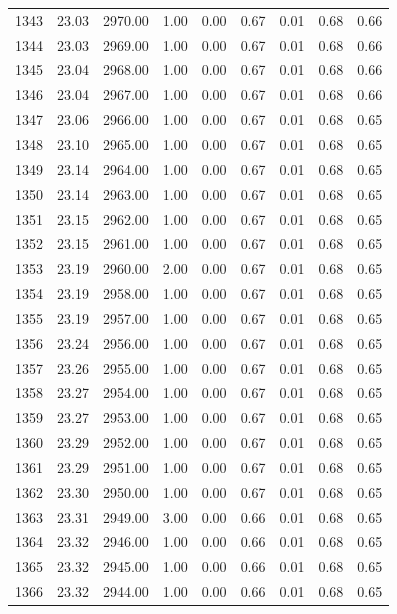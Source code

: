 \documentclass{article}\usepackage[]{graphicx}\usepackage[]{color}
\begin{document}
\begin{longtable}{rrrrrrrrr}
  1343 & 23.03 & 2970.00 & 1.00 & 0.00 & 0.67 & 0.01 & 0.68 & 0.66 \\ 
  1344 & 23.03 & 2969.00 & 1.00 & 0.00 & 0.67 & 0.01 & 0.68 & 0.66 \\ 
  1345 & 23.04 & 2968.00 & 1.00 & 0.00 & 0.67 & 0.01 & 0.68 & 0.66 \\ 
  1346 & 23.04 & 2967.00 & 1.00 & 0.00 & 0.67 & 0.01 & 0.68 & 0.66 \\ 
  1347 & 23.06 & 2966.00 & 1.00 & 0.00 & 0.67 & 0.01 & 0.68 & 0.65 \\ 
  1348 & 23.10 & 2965.00 & 1.00 & 0.00 & 0.67 & 0.01 & 0.68 & 0.65 \\ 
  1349 & 23.14 & 2964.00 & 1.00 & 0.00 & 0.67 & 0.01 & 0.68 & 0.65 \\ 
  1350 & 23.14 & 2963.00 & 1.00 & 0.00 & 0.67 & 0.01 & 0.68 & 0.65 \\ 
  1351 & 23.15 & 2962.00 & 1.00 & 0.00 & 0.67 & 0.01 & 0.68 & 0.65 \\ 
  1352 & 23.15 & 2961.00 & 1.00 & 0.00 & 0.67 & 0.01 & 0.68 & 0.65 \\ 
  1353 & 23.19 & 2960.00 & 2.00 & 0.00 & 0.67 & 0.01 & 0.68 & 0.65 \\ 
  1354 & 23.19 & 2958.00 & 1.00 & 0.00 & 0.67 & 0.01 & 0.68 & 0.65 \\ 
  1355 & 23.19 & 2957.00 & 1.00 & 0.00 & 0.67 & 0.01 & 0.68 & 0.65 \\ 
  1356 & 23.24 & 2956.00 & 1.00 & 0.00 & 0.67 & 0.01 & 0.68 & 0.65 \\ 
  1357 & 23.26 & 2955.00 & 1.00 & 0.00 & 0.67 & 0.01 & 0.68 & 0.65 \\ 
  1358 & 23.27 & 2954.00 & 1.00 & 0.00 & 0.67 & 0.01 & 0.68 & 0.65 \\ 
  1359 & 23.27 & 2953.00 & 1.00 & 0.00 & 0.67 & 0.01 & 0.68 & 0.65 \\ 
  1360 & 23.29 & 2952.00 & 1.00 & 0.00 & 0.67 & 0.01 & 0.68 & 0.65 \\ 
  1361 & 23.29 & 2951.00 & 1.00 & 0.00 & 0.67 & 0.01 & 0.68 & 0.65 \\ 
  1362 & 23.30 & 2950.00 & 1.00 & 0.00 & 0.67 & 0.01 & 0.68 & 0.65 \\ 
  1363 & 23.31 & 2949.00 & 3.00 & 0.00 & 0.66 & 0.01 & 0.68 & 0.65 \\ 
  1364 & 23.32 & 2946.00 & 1.00 & 0.00 & 0.66 & 0.01 & 0.68 & 0.65 \\ 
  1365 & 23.32 & 2945.00 & 1.00 & 0.00 & 0.66 & 0.01 & 0.68 & 0.65 \\ 
  1366 & 23.32 & 2944.00 & 1.00 & 0.00 & 0.66 & 0.01 & 0.68 & 0.65 \\ 

\end{longtable}
\end{document}
